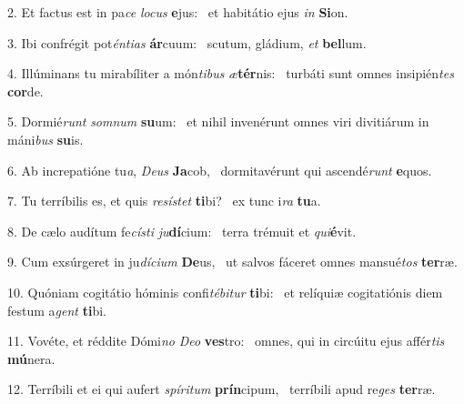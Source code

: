2. Et factus est in pa\textit{ce} \textit{lo}\textit{cus} \textbf{e}jus: \ast\  et habitátio ejus \textit{in} \textbf{Si}on.\

3. Ibi confrégit pot\textit{én}\textit{ti}\textit{as} \textbf{ár}cuum: \ast\  scutum, gládium, \textit{et} \textbf{bel}lum.\

4. Illúminans tu mirabíliter a món\textit{ti}\textit{bus} \textit{æ}\textbf{tér}nis: \ast\  turbáti sunt omnes insipién\textit{tes} \textbf{cor}de.\

5. Dormié\textit{runt} \textit{som}\textit{num} \textbf{su}um: \ast\  et nihil invenérunt omnes viri divitiárum in máni\textit{bus} \textbf{su}is.\

6. Ab increpatióne tu\textit{a}, \textit{De}\textit{us} \textbf{Ja}cob, \ast\  dormitavérunt qui ascendé\textit{runt} \textbf{e}quos.\

7. Tu terríbilis es, et quis \textit{re}\textit{sís}\textit{tet} \textbf{ti}bi? \ast\  ex tunc i\textit{ra} \textbf{tu}a.\

8. De cælo audítum fe\textit{cís}\textit{ti} \textit{ju}\textbf{dí}cium: \ast\  terra trémuit et \textit{qui}\textbf{é}vit.\

9. Cum exsúrgeret in ju\textit{dí}\textit{ci}\textit{um} \textbf{De}us, \ast\  ut salvos fáceret omnes mansué\textit{tos} \textbf{ter}ræ.\

10. Quóniam cogitátio hóminis confi\textit{té}\textit{bi}\textit{tur} \textbf{ti}bi: \ast\  et relíquiæ cogitatiónis diem festum a\textit{gent} \textbf{ti}bi.\

11. Vovéte, et réddite Dómi\textit{no} \textit{De}\textit{o} \textbf{ves}tro: \ast\  omnes, qui in circúitu ejus affér\textit{tis} \textbf{mú}nera.\

12. Terríbili et ei qui aufert \textit{spí}\textit{ri}\textit{tum} \textbf{prín}cipum, \ast\  terríbili apud re\textit{ges} \textbf{ter}ræ.\


